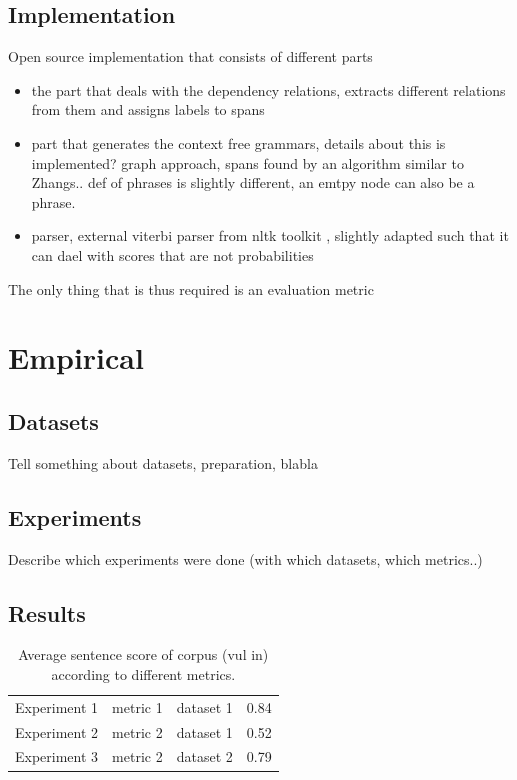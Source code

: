 \documentclass{report}
\theoremstyle{indented}
\begin{document}
\section{Implementation}

Open source implementation that consists of different parts

\begin{itemize}
\item the part that deals with the dependency relations, extracts different relations from them and assigns labels to spans
\item part that generates the context free grammars, details about this is implemented? graph approach, spans found by an algorithm similar to Zhangs.. def of phrases is slightly different, an emtpy node can also be a phrase.
\item parser, external viterbi parser from nltk toolkit \citep{bird2009natural}, slightly adapted such that it can dael with scores that are not probabilities 
\end{itemize}

The only thing that is thus required is an evaluation metric

\chapter{Empirical}

\section{Datasets}

Tell something about datasets, preparation, blabla

\section{Experiments}

Describe which experiments were done (with which datasets, which metrics..)

\section{Results}

\begin{table}\label{tab:scores}
\begin{tabular}{llll}
Experiment 1 & metric 1 & dataset 1 & 0.84\\
Experiment 2 & metric 2 & dataset 1 & 0.52\\
Experiment 3 & metric 2 & dataset 2 & 0.79\\
\end{tabular}
\caption{Average sentence score of corpus (vul in) according to different metrics.}
\end{table}
\end{document}
